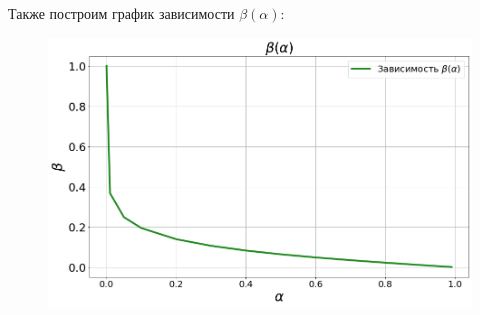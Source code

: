 \documentclass[14pt]{extarticle}
\begin{document}
Также построим график зависимости $\beta(\alpha)$:
\begin{figure}
\begin{center}
	{\includegraphics[scale=0.5]{Medyakov53.png}}
\end{center}
\end{figure}
\end{document}
